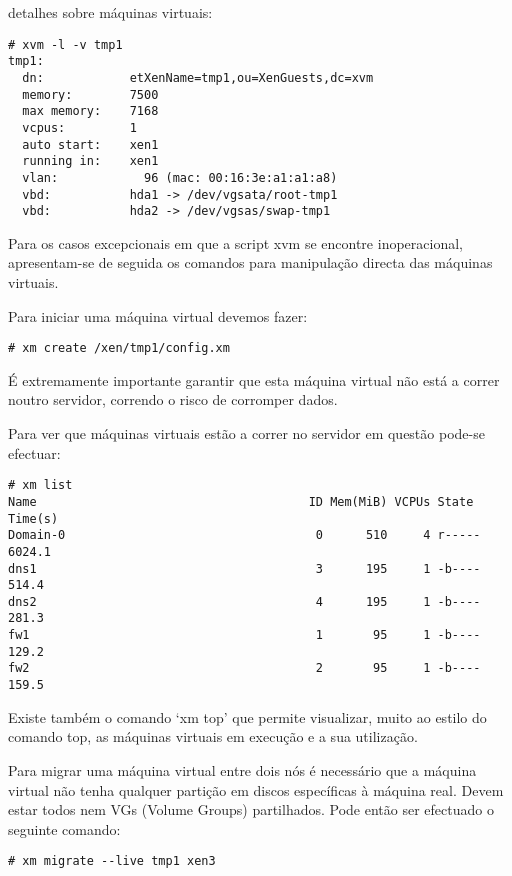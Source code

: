 detalhes sobre máquinas virtuais:

\begin{Verbatim}[commandchars=\\\{\}]
# xvm -l -v tmp1
tmp1:
  dn:            etXenName=tmp1,ou=XenGuests,dc=xvm
  memory:        7500
  max memory:    7168
  vcpus:         1
  auto start:    xen1
  running in:    xen1
  vlan:            96 (mac: 00:16:3e:a1:a1:a8)
  vbd:           hda1 -> /dev/vgsata/root-tmp1
  vbd:           hda2 -> /dev/vgsas/swap-tmp1
\end{Verbatim}

Para os casos excepcionais em que a script xvm se encontre inoperacional, apresentam-se de seguida os comandos para manipulação directa das máquinas virtuais.

Para iniciar uma máquina virtual devemos fazer:

\begin{Verbatim}[commandchars=\\\{\}]
# xm create /xen/tmp1/config.xm
\end{Verbatim}

É extremamente importante garantir que esta máquina virtual não está a correr noutro servidor, correndo o risco de corromper dados.

Para ver que máquinas virtuais estão a correr no servidor em questão pode-se efectuar:

\begin{Verbatim}[commandchars=\\\{\}]
# xm list
Name                                      ID Mem(MiB) VCPUs State   Time(s)
Domain-0                                   0      510     4 r-----   6024.1
dns1                                       3      195     1 -b----    514.4
dns2                                       4      195     1 -b----    281.3
fw1                                        1       95     1 -b----    129.2
fw2                                        2       95     1 -b----    159.5
\end{Verbatim}

Existe também o comando `xm top' que permite visualizar, muito ao estilo do comando top, as máquinas virtuais em execução e a sua utilização.

Para migrar uma máquina virtual entre dois nós é necessário que a máquina virtual não tenha qualquer partição em discos específicas à máquina real. Devem estar todos nem VGs (Volume Groups) partilhados. Pode então ser efectuado o seguinte comando:

\begin{Verbatim}[commandchars=\\\{\}]
# xm migrate --live tmp1 xen3
\end{Verbatim}

